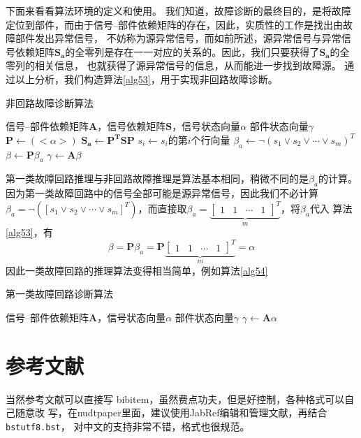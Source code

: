 下面来看看算法环境的定义和使用。
我们知道，故障诊断的最终目的，是将故障定位到部件，而由于信号--部件依赖矩阵的存在，因此，实质性的工作是找出由故障部件发出异常信号，
不妨称为源异常信号，而如前所述，源异常信号与异常信号依赖矩阵$\mathbf{S_a}$的全零列是存在一一对应的关系的。因此，我们只要获得了$\mathbf{S_a}$的全零列的相关信息，
也就获得了源异常信号的信息，从而能进一步找到故障源。
通过以上分析，我们构造算法\ref{alg53}，用于实现非回路故障诊断。
\begin{algorithm}[htbp]
  \caption{非回路故障诊断算法}
  \label{alg53}
  \begin{algorithmic}[1]
    \REQUIRE 信号--部件依赖矩阵$\mathbf{A}$，信号依赖矩阵$\mathbf{S}$，信号状态向量$\alpha$
    \ENSURE 部件状态向量$\gamma$
    \STATE $\mathbf{P}\leftarrow\left(<\alpha>\right)$
    \STATE $\mathbf{S_{a}}\leftarrow\mathbf{P^T}\mathbf{S}\mathbf{P}$
    \STATE $s_i\leftarrow s_i$的第$i$个行向量
    \ENDFOR
    \STATE $\beta_a\leftarrow\lnot \left(s_1\lor s_2\lor \cdots\lor s_m\right)^T$
    \STATE $\beta\leftarrow\mathbf{P}\beta_a$
    \STATE $\gamma\leftarrow\mathbf{A}\beta$
  \end{algorithmic}
\end{algorithm}

第一类故障回路推理与非回路故障推理是算法基本相同，稍微不同的是$\beta_a$的计算。因为第一类故障回路中的信号全部可能是源异常信号，因此我们不必计算
$\beta_a=\lnot \left(\left[s_1\lor s_2\lor \cdots\lor s_m\right]^T\right)$，而直接取$\beta_a=\underbrace{\left[\begin{array}{cccc}1&1&\cdots&1\end{array}\right]^T}_m$，将$\beta_a$代入
算法\ref{alg53}，有
\[\beta=\mathbf{P}\beta_a=\mathbf{P}\underbrace{\left[\begin{array}{cccc}1&1&\cdots&1\end{array}\right]^T}_m=\alpha\]
因此一类故障回路的推理算法变得相当简单，例如算法\ref{alg54}
\begin{algorithm}[htbp]
  \caption{第一类故障回路诊断算法}
  \label{alg54}
  \begin{algorithmic}[1]
    \REQUIRE 信号--部件依赖矩阵$\mathbf{A}$，信号状态向量$\alpha$
    \ENSURE 部件状态向量$\gamma$
    \STATE $\gamma\leftarrow\mathbf{A}\alpha$
  \end{algorithmic}
\end{algorithm}

\section{参考文献}
\label{sec:bib}
当然参考文献可以直接写 bibitem，虽然费点功夫，但是好控制，各种格式可以自己随意改
写，在nudtpaper里面，建议使用JabRef编辑和管理文献，再结合\verb|bstutf8.bst|，
对中文的支持非常不错，格式也很规范。

